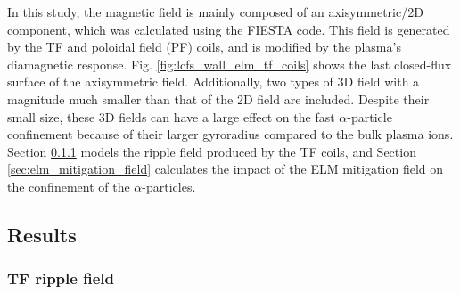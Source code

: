 \documentclass[10pt, a4paper, twoside]{article}
\begin{document}
In this study, the magnetic field is mainly composed of an axisymmetric/2D component, which was calculated using the FIESTA code. This field is generated by the TF and poloidal field (PF) coils, and is modified by the plasma's diamagnetic response. Fig. \ref{fig:lcfs_wall_elm_tf_coils} shows the last closed-flux surface of the axisymmetric field. Additionally, two types of 3D field with a magnitude much smaller than that of the 2D field are included. Despite their small size, these 3D fields can have a large effect on the fast $\alpha$-particle confinement because of their larger gyroradius compared to the bulk plasma ions. Section \ref{sec:tf_ripple_field} models the ripple field produced by the TF coils, and Section \ref{sec:elm_mitigation_field} calculates the impact of the ELM mitigation field on the confinement of the $\alpha$-particles.

\subsection{Results}

\subsubsection{TF ripple field}
\label{sec:tf_ripple_field}
\end{document}
